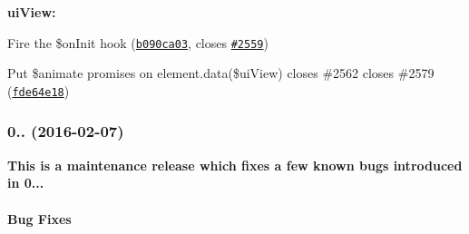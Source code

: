 {\bfseries {\bfseries }}

{\bfseries {\bfseries 
\begin{DoxyItemize}
\item {\bfseries ui\+View\+:}
\begin{DoxyItemize}
\item Fire the \$on\+Init hook (\href{https://github.com/angular-ui/ui-router/commit/b090ca0352eabc13662a8702a2b227b7db606362}{\tt b090ca03}, closes \href{https://github.com/angular-ui/ui-router/issues/2559}{\tt \#2559})
\item Put \$animate promises on element.\+data(\textquotesingle{}\$ui\+View\textquotesingle{}) closes \#2562 closes \#2579 (\href{https://github.com/angular-ui/ui-router/commit/fde64e1897041e59cbc9f8d07b269dcd487abb9c}{\tt fde64e18})
\end{DoxyItemize}
\end{DoxyItemize}}}

{\bfseries {\bfseries \label{_0.2.18}%
 \subsubsection*{0.. (2016-\/02-\/07)}}}

{\bfseries {\bfseries }}

{\bfseries {\bfseries This is a maintenance release which fixes a few known bugs introduced in 0...}}

{\bfseries {\bfseries \paragraph*{Bug Fixes}}}

{\bfseries {\bfseries }}

